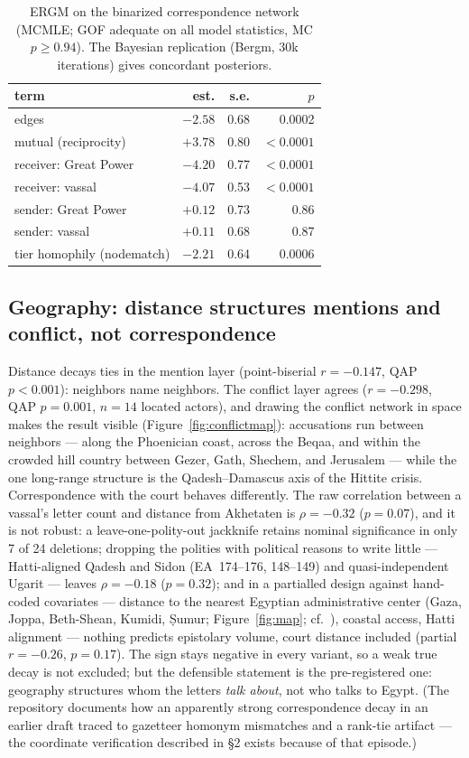\documentclass[11pt]{article}
\begin{document}
\begin{table}[tb]
\centering\small
\caption{ERGM on the binarized correspondence network (MCMLE; GOF
adequate on all model statistics, MC $p\ge0.94$). The Bayesian
replication (Bergm, 30k iterations) gives concordant posteriors.}
\label{tab:ergm}
\begin{tabular}{lrrr}
\toprule
term & est. & s.e. & $p$ \\
\midrule
edges & $-2.58$ & 0.68 & 0.0002 \\
mutual (reciprocity) & $+3.78$ & 0.80 & $<0.0001$ \\
receiver: Great Power & $-4.20$ & 0.77 & $<0.0001$ \\
receiver: vassal & $-4.07$ & 0.53 & $<0.0001$ \\
sender: Great Power & $+0.12$ & 0.73 & 0.86 \\
sender: vassal & $+0.11$ & 0.68 & 0.87 \\
tier homophily (nodematch) & $-2.21$ & 0.64 & 0.0006 \\
\bottomrule
\end{tabular}
\end{table}

\subsection{Geography: distance structures mentions and conflict, not
correspondence}
\label{sec:geography}

Distance decays ties in the mention layer (point-biserial $r=-0.147$,
QAP $p<0.001$): neighbors name neighbors. The conflict layer agrees
($r=-0.298$, QAP $p=0.001$, $n=14$ located actors), and drawing the
conflict network in space makes the result visible
(Figure~\ref{fig:conflictmap}): accusations run between neighbors ---
along the Phoenician coast, across the Beqaa, and within the crowded
hill country between Gezer, Gath, Shechem, and Jerusalem --- while the
one long-range structure is the Qadesh--Damascus axis of the Hittite
crisis. Correspondence with the court behaves differently. The raw
correlation between a vassal's letter count and distance from Akhetaten
is $\rho=-0.32$ ($p=0.07$), and it is not robust: a leave-one-polity-out
jackknife retains nominal significance in only 7 of 24 deletions;
dropping the polities with political reasons to write little ---
Hatti-aligned Qadesh and Sidon (EA~174--176, 148--149) and
quasi-independent Ugarit --- leaves $\rho=-0.18$ ($p=0.32$); and in a
partialled design against hand-coded covariates --- distance to the
nearest Egyptian administrative center (Gaza, Joppa, Beth-Shean, Kumidi,
Ṣumur; Figure~\ref{fig:map}; cf.\ \citealp{Morris2005}), coastal
access, Hatti alignment --- nothing predicts epistolary volume, court
distance included (partial $r=-0.26$, $p=0.17$). The sign stays
negative in every variant, so a weak true decay is not excluded; but
the defensible statement is the pre-registered one: geography
structures whom the letters \emph{talk about}, not who talks to Egypt.
(The repository documents how an apparently strong correspondence decay
in an earlier draft traced to gazetteer homonym mismatches and a
rank-tie artifact --- the coordinate verification described in \S2
exists because of that episode.)
\end{document}

